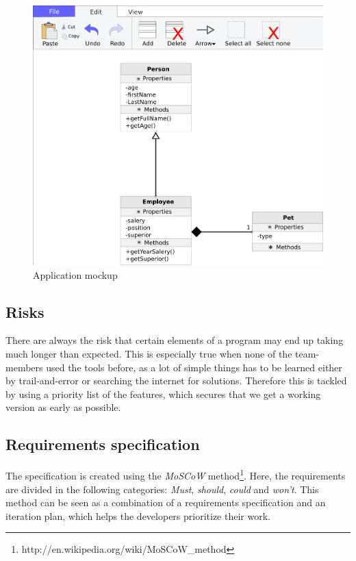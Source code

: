 \begin{figure}[H]
\centering
\includegraphics[width=\linewidth]{img/mockup}
\caption{Application mockup \label{mockup}}
\end{figure}

\subsection{Risks}
There are always the risk that certain elements of a program may end up taking
much longer than expected. This is especially true when none of the team-members
used the tools before, as a lot of simple things has to be learned either by
trail-and-error or searching the internet for solutions. Therefore this is
tackled by using a priority list of the features, which secures that we get a
working version as early as possible.

\newpage
\subsection{Requirements specification}
The specification is created using the \textit{MoSCoW} 
method\footnote{http://en.wikipedia.org/wiki/MoSCoW\_method}. Here, the 
requirements 
are divided in the following categories: \textit{Must}, \textit{should}, 
\textit{could} and \textit{won't}. This method can be seen as a combination of 
a requirements specification and an iteration plan, which helps the developers 
prioritize their work.

